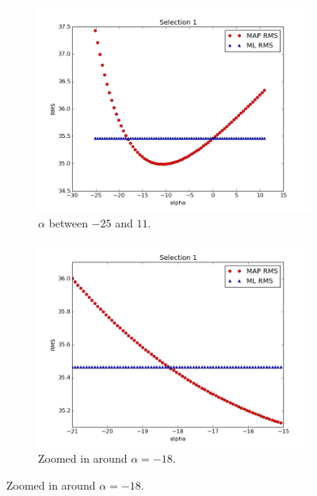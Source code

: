 \documentclass[a4paper]{article}
\begin{document}
\begin{figure}[H]
  \begin{adjustwidth}{-7em}{-7em}
    \centering
    \begin{subfigure}{.32\linewidth}
      \includegraphics[width=\linewidth]{figures/alpha_vs_rms_selection1a.png}
      \caption{$\alpha$ between $-25$ and $11$.}
      \label{fig:alpha_vs_rms_selection1a}
    \end{subfigure}
    \begin{subfigure}{.32\linewidth}
      \includegraphics[width=\linewidth]{figures/alpha_vs_rms_selection1b.png}
      \caption{Zoomed in around $\alpha = -18$.}
      \label{fig:alpha_vs_rms_selection1b}
    \end{subfigure}

\end{adjustwidth}
\end{figure}
\end{document}
